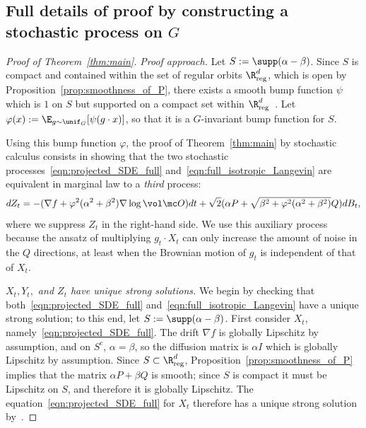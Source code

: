 \documentclass[twoside,a4paper,11pt]{article}
\renewcommand{\phi}{\varphi}
\newcommand{\reg}{\mathrm{reg}}
\theoremstyle{plain}
\begin{document}
\subsection{Full details of proof by constructing
a stochastic process on $G$}

\begin{proof}[Proof of Theorem~\ref{thm:main}]
{\it Proof approach.}
Let
$S := \supp(\alpha - \beta)$.
Since $S$ is compact and contained within
the set of regular orbits $\R^d_{\reg}$,
which is open by Proposition~\ref{prop:smoothness_of_P},
there exists a smooth bump function $\psi$
which is $1$ on $S$ but supported
on a compact set within $\R^d_{\reg}$~\cite[Proposition 2.25]{lee2013introduction}.
Let $\phi(x) := \E_{g\sim \unif_G}[\psi(g\cdot x)]$,
so that it is a $G$-invariant bump function for $S$.

Using this bump function $\phi$,
the proof of Theorem~\ref{thm:main}
by stochastic calculus consists in showing
that the two stochastic processes~\eqref{eqn:projected_SDE_full}
and~\eqref{eqn:full_isotropic_Langevin} are equivalent
in marginal law
to a {\it third} process:
\begin{equation}\label{eqn:auxiliary_SDE}
dZ_t = -(\nabla f + \phi^2(\alpha^2 + \beta^2)
\nabla \log \vol \mc O)dt 
+ \sqrt{2}(\alpha P
+ \sqrt{\beta^2 + \phi^2(\alpha^2 + \beta^2)}Q)dB_t,
\end{equation} where we suppress
$Z_t$ in the right-hand side.
We use this auxiliary
process because the ansatz of multiplying
$g_t \cdot X_t$ can only increase the amount of noise
in the $Q$ directions, at least when the Brownian motion of $g_t$
is independent of that of $X_t$.

{\it $X_t,Y_t,$ and $Z_t$ have unique strong solutions.} 
We begin by checking that both~\eqref{eqn:projected_SDE_full}
and~\eqref{eqn:full_isotropic_Langevin}
have a unique strong solution;
to this end, let
$S := \supp(\alpha - \beta)$.
First consider $X_t$, namely~\eqref{eqn:projected_SDE_full}.
The drift $\nabla f$ is globally Lipschitz by assumption,
and on $S^c$, $\alpha = \beta$, so
the diffusion matrix is $\alpha I$ which is globally Lipschitz
by assumption. Since $S \subset \R^d_{\reg}$,
Proposition~\ref{prop:smoothness_of_P}
implies that
the matrix $\alpha P + \beta Q$ is smooth;
since $S$ is compact it must be Lipschitz on $S$,
and therefore it is globally Lipschitz.
The equation~\eqref{eqn:projected_SDE_full}
for $X_t$
therefore has a unique strong solution by~\cite[Theorem 5.2.1]{oksendal2013stochastic}.


\end{proof}
\end{document}
